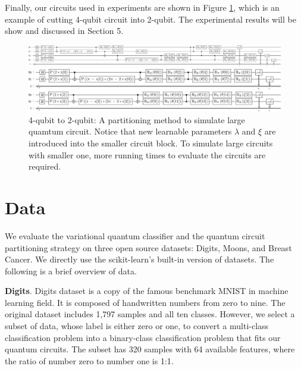 \documentclass[sigconf]{acmart}
\begin{document}
Finally, our circuits used in experiments are shown in Figure \ref{fig:cutting}, which is an example of cutting 4-qubit circuit into 2-qubit. The experimental results will be show and discussed in Section 5.
\begin{figure}[!ht]
	\begin{minipage}[t]{0.9\textwidth}%
		\centering
		\includegraphics[width=\textwidth]{lar.png}
	\end{minipage}
	\begin{minipage}[t]{0.9\textwidth}%
		\centering
		\includegraphics[width=\textwidth]{par1.png}
	\end{minipage}
	\begin{minipage}[t]{0.9\textwidth}%
	    \centering
		\includegraphics[width=\textwidth]{par2.png}
	\end{minipage}
	\caption{4-qubit to 2-qubit: {\small \textnormal{A partitioning method to simulate large quamtum circuit. Notice that new learnable parameters $\lambda$ and $\xi$ are introduced into the smaller circuit block. To simulate large circuits with smaller one, more running times to evaluate the circuits are required.}} }
	\label{fig:cutting}
\end{figure}

\section{Data}
We evaluate the variational quantum classifier and the quantum circuit partitioning strategy on three open source datasets: Digits, Moons, and Breast Cancer. We directly use the scikit-learn's built-in version of datasets. The following is a brief overview of data.

\vspace{0.2cm}
\noindent\textbf{Digits}. Digits dataset is a copy of the famous benchmark MNIST in machine learning field. It is composed of handwritten numbers from zero to nine. The original dataset includes 1,797 samples and all ten classes. However, we select a subset of data, whose label is either zero or one, to convert a multi-class classification problem into a binary-class classification problem that fits our quantum circuits. The subset has 320 samples with 64 available features, where the ratio of number zero to number one is 1:1.
\end{document}
